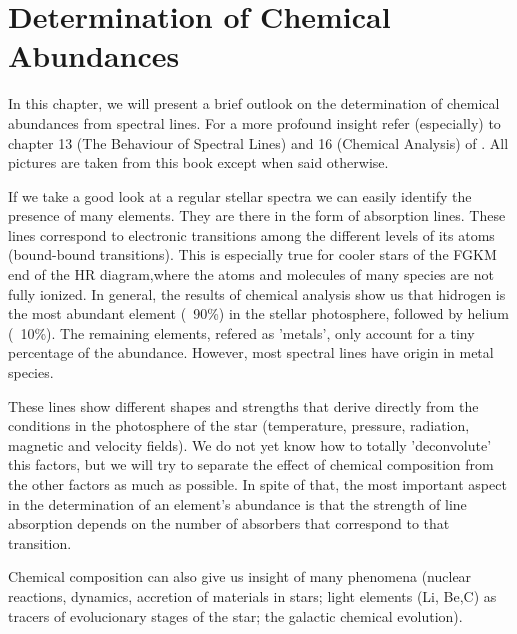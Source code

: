 \documentclass[dvips,12pt,a4paper]{report}
\begin{document}
{%

\chapter{Determination of Chemical Abundances}

\indent In this chapter, we will present a brief outlook on the determination of chemical abundances from spectral lines. For a more profound insight refer (especially) to chapter 13 (The Behaviour of Spectral Lines) and 16 (Chemical Analysis) of \citet{Gray-2005}. All pictures are taken from this book except when said otherwise.

If we take a good look at a regular stellar spectra we can easily identify the presence of many elements. They are there in the form of absorption lines. These lines correspond to electronic transitions among the different levels of its atoms (bound-bound transitions). This is especially true for cooler stars of the FGKM end of the HR diagram,where the atoms and molecules of many species are not fully ionized. In general, the results of chemical analysis show us that hidrogen is the most abundant element (~90\%) in the stellar photosphere, followed by helium (~10\%). The remaining elements, refered as 'metals', only account for a tiny percentage of the abundance. However, most spectral lines have origin in metal species.

These lines show different shapes and strengths that derive directly from the conditions in the photosphere of the star (temperature, pressure, radiation, magnetic and velocity fields). We do not yet know how to totally 'deconvolute' this factors, but we will try to separate the effect of chemical composition from the other factors as much as possible. In spite of that, the most important aspect in the determination of an element's abundance is that the strength of line absorption depends on the number of absorbers that correspond to that transition. 

Chemical composition can also give us insight of many phenomena (nuclear reactions, dynamics, accretion of materials in stars; light elements (Li, Be,C) as tracers of evolucionary stages of the star; the galactic chemical evolution). 

}
\end{document}
